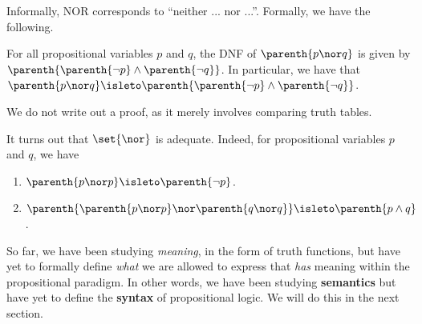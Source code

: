 Informally, NOR corresponds to ``neither ... nor ...''. Formally, we have the following.

\begin{boxlemma}
    For all propositional variables $p$ and $q$, the DNF of $\parenth{p \nor q}$ is given by $\parenth{\parenth{\neg p} \land \parenth{\neg q}}$. In particular, we have that $\parenth{p \nor q} \isleto \parenth{\parenth{\neg p} \land \parenth{\neg q}}$.
\end{boxlemma}
We do not write out a proof, as it merely involves comparing truth tables.

\begin{boxexample}
    It turns out that $\set{\nor}$ is adequate. Indeed, for propositional variables $p$ and $q$, we have
    \begin{enumerate}
        \item $\parenth{p \nor p} \isleto \parenth{\neg p}$.
        \item $\parenth{\parenth{p \nor p} \nor \parenth{q \nor q}} \isleto \parenth{p \land q}$.
    \end{enumerate}
\end{boxexample}

So far, we have been studying \textit{meaning}, in the form of truth functions, but have yet to formally define \textit{what} we are allowed to express that \textit{has} meaning within the propositional paradigm. In other words, we have been studying \textbf{semantics} but have yet to define the \textbf{syntax} of propositional logic. We will do this in the next section.
